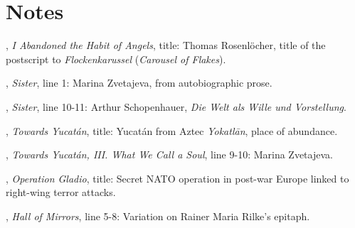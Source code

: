 \documentclass[11pt,twoside,final]{memoir}
\begin{document}
\setcounter{chapter}{0}







\chapter{Notes}

\thispagestyle{normalpage}
\normalsize

{\setlength{\parindent}{0pt}
\setlength{\parskip}{\onelineskip}

, \textit{I Abandoned the Habit of Angels}, title: Thomas Rosenlöcher, title of the postscript to \textit{Flockenkarussel} (\textit{Carousel of Flakes}).

, \textit{Sister}, line 1: Marina Zvetajeva, from autobiographic prose.

, \textit{Sister}, line 10-11: Arthur Schopenhauer, \textit{Die Welt als Wille und Vorstellung}.

, \textit{Towards Yucatán}, title: Yucatán from Aztec \textit{Yokatlān}, place of abundance.

, \textit{Towards Yucatán, III. What We Call a Soul}, line 9-10: Marina Zvetajeva.

, \textit{Operation Gladio}, title: Secret NATO operation in post-war Europe linked to right-wing terror attacks.

, \textit{Hall of Mirrors}, line 5-8: Variation on Rainer Maria Rilke's epitaph.

}

\newpage
\thispagestyle{empty}
\mbox{}
\end{document}
